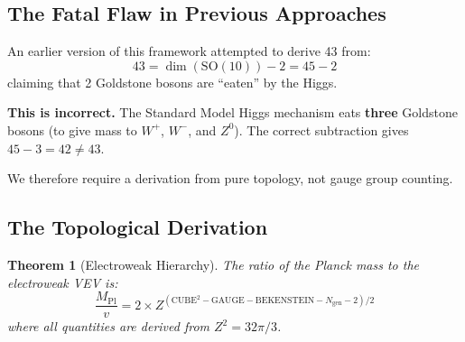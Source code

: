 \documentclass[11pt,a4paper]{article}
\theoremstyle{plain}
\newtheorem{theorem}{Theorem}[section]
\theoremstyle{definition}
\theoremstyle{remark}
\newcommand{\Mpl}{M_{\text{Pl}}}
\newcommand{\Ngen}{N_{\text{gen}}}
\newcommand{\SOten}{\text{SO}(10)}
\newcommand{\CUBE}{\text{CUBE}}
\newcommand{\GAUGE}{\text{GAUGE}}
\newcommand{\BEK}{\text{BEKENSTEIN}}
\begin{document}
\subsection{The Fatal Flaw in Previous Approaches}

An earlier version of this framework attempted to derive 43 from:
\[
43 = \dim(\SOten) - 2 = 45 - 2
\]
claiming that 2 Goldstone bosons are ``eaten'' by the Higgs.

\textbf{This is incorrect.} The Standard Model Higgs mechanism eats \textbf{three} Goldstone bosons (to give mass to $W^+$, $W^-$, and $Z^0$). The correct subtraction gives $45 - 3 = 42 \neq 43$.

We therefore require a derivation from pure topology, not gauge group counting.

\subsection{The Topological Derivation}

\begin{theorem}[Electroweak Hierarchy]
The ratio of the Planck mass to the electroweak VEV is:
\[
\frac{\Mpl}{v} = 2 \times Z^{(\CUBE^2 - \GAUGE - \BEK - \Ngen - 2)/2}
\]
where all quantities are derived from $Z^2 = 32\pi/3$.
\end{theorem}
\end{document}
